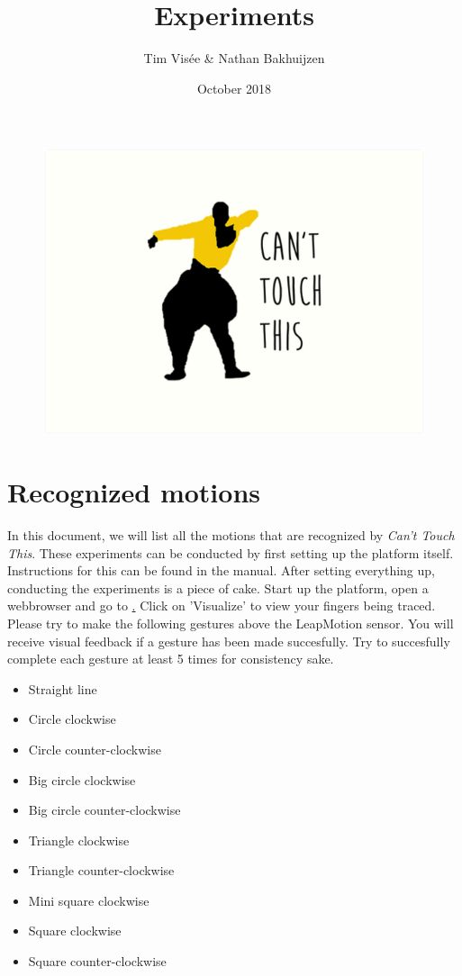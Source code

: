 \documentclass[a4paper]{article}
\title{Experiments}
\author{Tim Visée \& Nathan Bakhuijzen}
\date{October 2018}
\providecommand{\tightlist}{%
\setlength{\itemsep}{0pt}\setlength{\parskip}{0pt}}
\begin{document}
  \maketitle
  \begin{figure}[h]
    \centering
    \includegraphics[width=\linewidth]{cant-touch-this}
  \end{figure}
  \clearpage

  \section{Recognized motions}
  In this document, we will list all the motions that are recognized by
  \textit{Can't Touch This}. These experiments can be conducted by first setting
  up the platform itself. Instructions for this can be found in the manual.
  After setting everything up, conducting the experiments is a piece of cake.
  Start up the platform, open a webbrowser and go to
  \href{http://localhost:8000}. Click on 'Visualize' to view your fingers being
  traced.\\

  Please try to make the following gestures above the LeapMotion sensor. You
  will receive visual feedback if a gesture has been made succesfully. Try to
  succesfully complete each gesture at least 5 times for consistency sake.

  \begin{itemize}
    \tightlist
    \item Straight line
    \item Circle clockwise
    \item Circle counter-clockwise
    \item Big circle clockwise
    \item Big circle counter-clockwise
    \item Triangle clockwise
    \item Triangle counter-clockwise
    \item Mini square clockwise
    \item Square clockwise
    \item Square counter-clockwise
  \end{itemize}
\end{document}
